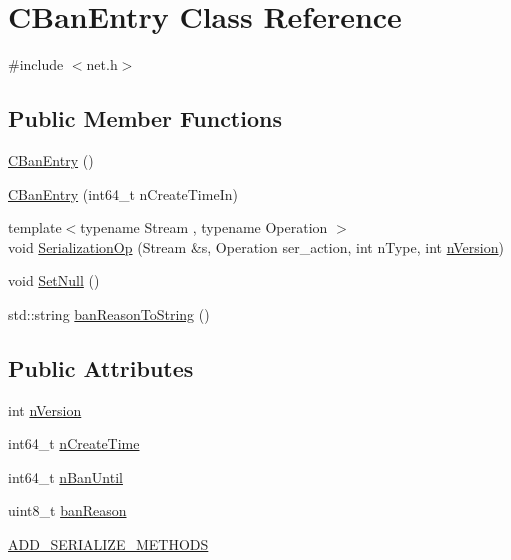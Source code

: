 \hypertarget{class_c_ban_entry}{}\section{C\+Ban\+Entry Class Reference}
\label{class_c_ban_entry}


{\ttfamily \#include $<$net.\+h$>$}

\subsection*{Public Member Functions}
\begin{DoxyCompactItemize}
\item 
\mbox{\hyperlink{class_c_ban_entry_a669048b5cb38027b18ba179a1027211b}{C\+Ban\+Entry}} ()
\item 
\mbox{\hyperlink{class_c_ban_entry_a6b787cdf29a5ce8688845e15f5153a64}{C\+Ban\+Entry}} (int64\+\_\+t n\+Create\+Time\+In)
\item 
{\footnotesize template$<$typename Stream , typename Operation $>$ }\\void \mbox{\hyperlink{class_c_ban_entry_aba9cee585ab7313f54a9397e6c449732}{Serialization\+Op}} (Stream \&s, Operation ser\+\_\+action, int n\+Type, int \mbox{\hyperlink{class_c_ban_entry_acfe8c22d99805d72b0144cbb525a58f1}{n\+Version}})
\item 
void \mbox{\hyperlink{class_c_ban_entry_a7c2cd7c6ef6a7507c384697e46a23b2e}{Set\+Null}} ()
\item 
std\+::string \mbox{\hyperlink{class_c_ban_entry_ada434bfaaa0ba57a7ad4c62cf5cbcda5}{ban\+Reason\+To\+String}} ()
\end{DoxyCompactItemize}
\subsection*{Public Attributes}
\begin{DoxyCompactItemize}
\item 
int \mbox{\hyperlink{class_c_ban_entry_acfe8c22d99805d72b0144cbb525a58f1}{n\+Version}}
\item 
int64\+\_\+t \mbox{\hyperlink{class_c_ban_entry_a646408bd4046c05a14fb4aa8fbc1541a}{n\+Create\+Time}}
\item 
int64\+\_\+t \mbox{\hyperlink{class_c_ban_entry_ad055d0792f71b5da238c668ef0a27109}{n\+Ban\+Until}}
\item 
uint8\+\_\+t \mbox{\hyperlink{class_c_ban_entry_a70899703ea4dcfe6056f4db8b7f77126}{ban\+Reason}}
\item 
\mbox{\hyperlink{class_c_ban_entry_a1bcaf68df27f2c194d91fb56630ed6ac}{A\+D\+D\+\_\+\+S\+E\+R\+I\+A\+L\+I\+Z\+E\+\_\+\+M\+E\+T\+H\+O\+DS}}
\end{DoxyCompactItemize}
